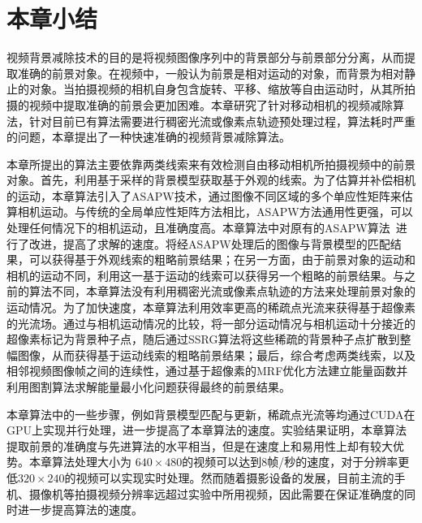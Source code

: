 \section{本章小结}
 \label{ch4:sec:conclusions}
 视频背景减除技术的目的是将视频图像序列中的背景部分与前景部分分离，从而提取准确的前景对象。在视频中，一般认为前景是相对运动的对象，而背景为相对静止的对象。当拍摄视频的相机自身包含旋转、平移、缩放等自由运动时，从其所拍摄的视频中提取准确的前景会更加困难。本章研究了针对移动相机的视频减除算法，针对目前已有算法需要进行稠密光流或像素点轨迹预处理过程，算法耗时严重的问题，本章提出了一种快速准确的视频背景减除算法。\par
 本章所提出的算法主要依靠两类线索来有效检测自由移动相机所拍摄视频中的前景对象。首先，利用基于采样的背景模型获取基于外观的线索。为了估算并补偿相机的运动，本章算法引入了ASAPW技术，通过图像不同区域的多个单应性矩阵来估算相机运动。与传统的全局单应性矩阵方法相比，ASAPW方法通用性更强，可以处理任何情况下的相机运动，且准确度高。本章算法中对原有的ASAPW算法~\cite{Liu_2013ASAP}进行了改进，提高了求解的速度。将经ASAPW处理后的图像与背景模型的匹配结果，可以获得基于外观线索的粗略前景结果；在另一方面，由于前景对象的运动和相机的运动不同，利用这一基于运动的线索可以获得另一个粗略的前景结果。与之前的算法不同，本章算法没有利用稠密光流或像素点轨迹的方法来处理前景对象的运动情况。为了加快速度，本章算法利用效率更高的稀疏点光流来获得基于超像素的光流场。通过与相机运动情况的比较，将一部分运动情况与相机运动十分接近的超像素标记为背景种子点，随后通过SSRG算法将这些稀疏的背景种子点扩散到整幅图像，从而获得基于运动线索的粗略前景结果；最后，综合考虑两类线索，以及相邻视频图像帧之间的连续性，通过基于超像素的MRF优化方法建立能量函数并利用图割算法求解能量最小化问题获得最终的前景结果。\par
 本章算法中的一些步骤，例如背景模型匹配与更新，稀疏点光流等均通过CUDA在GPU上实现并行处理，进一步提高了本章算法的速度。实验结果证明，本章算法提取前景的准确度与先进算法的水平相当，但是在速度上和易用性上却有较大优势。本章算法处理大小为 $640\times480$的视频可以达到8帧/秒的速度，对于分辨率更低$320\times240$的视频可以实现实时处理。然而随着摄影设备的发展，目前主流的手机、摄像机等拍摄视频分辨率远超过实验中所用视频，因此需要在保证准确度的同时进一步提高算法的速度。
